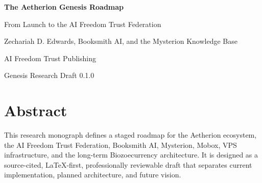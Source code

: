 \documentclass[11pt,openany]{book}
\newcommand{\BookTitle}{The Aetherion Genesis Roadmap}
\newcommand{\BookSubtitle}{From Launch to the AI Freedom Trust Federation}
\newcommand{\BookAuthor}{Zechariah D. Edwards, Booksmith AI, and the Mysterion Knowledge Base}
\newcommand{\BookPublisher}{AI Freedom Trust Publishing}
\newcommand{\BookEdition}{Genesis Research Draft 0.1.0}
\begin{document}
\frontmatter
\begin{titlepage}
\begin{center}
\vspace*{0.7in}
{\Huge\bfseries\color{AetherInk} \BookTitle\par}
\vspace{0.25in}
{\Large \BookSubtitle\par}
\vfill
{\Large \BookAuthor\par}
\vspace{0.4in}
{\small \BookPublisher\par}
{\small \BookEdition\par}
\end{center}
\end{titlepage}

\chapter*{Abstract}
This research monograph defines a staged roadmap for the Aetherion ecosystem, the AI Freedom Trust Federation, Booksmith AI, Mysterion, Mobox, VPS infrastructure, and the long-term Biozoecurrency architecture. It is designed as a source-cited, LaTeX-first, professionally reviewable draft that separates current implementation, planned architecture, and future vision.

\tableofcontents
\listoffigures
\listoftables

\mainmatter








\backmatter
\printbibliography[title={References}]
\end{document}

